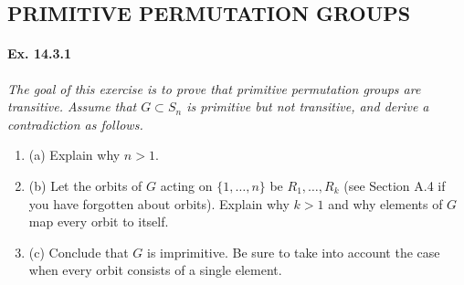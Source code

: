 \documentclass[11pt,a4paper]{article}
\newcommand{\be} {\begin{enumerate}}
\newcommand{\ee} {\end{enumerate}}
\begin{document}
\subsection{PRIMITIVE PERMUTATION GROUPS}

 \paragraph{Ex. 14.3.1}{\it The goal of this exercise is to prove that primitive permutation groups are transitive. Assume that $G \subset S_n$ is primitive but not transitive, and derive a contradiction as follows.
 \be
 \item[(a)] Explain why $n>1$.
 \item[(b)] Let the orbits of $G$ acting on $\{1,\ldots,n\}$ be $R_1,\ldots,R_k$ (see Section A.4 if you have forgotten about orbits). Explain why $k>1$ and why elements of $G$ map every orbit to itself.
 \item[(c)] Conclude that $G$ is imprimitive. Be sure to take into account the case when every orbit consists of a single element.
 \ee
 }
\end{document}
